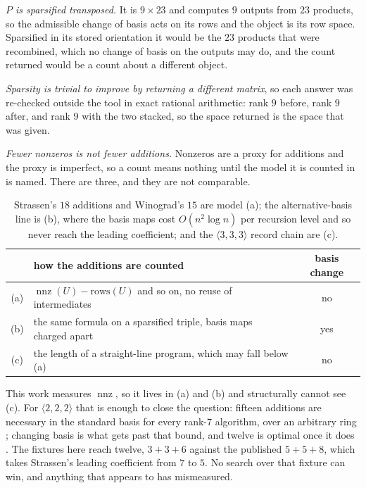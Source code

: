 \documentclass[11pt,reqno]{amsart}
\theoremstyle{plain}
\theoremstyle{definition}
\theoremstyle{remark}
\newcommand{\nnz}{\operatorname{nnz}}
\begin{document}
\emph{$P$ is sparsified transposed.} It is $9\times 23$ and computes $9$ outputs
from $23$ products, so the admissible change of basis acts on its rows and the
object is its row space. Sparsified in its stored orientation it would be the
$23$ products that were recombined, which no change of basis on the outputs may
do, and the count returned would be a count about a different object.

\emph{Sparsity is trivial to improve by returning a different matrix}, so each
answer was re-checked outside the tool in exact rational arithmetic: rank $9$
before, rank $9$ after, and rank $9$ with the two stacked, so the space returned
is the space that was given.

\emph{Fewer nonzeros is not fewer additions.} Nonzeros are a proxy for additions
and the proxy is imperfect, so a count means nothing until the model it is
counted in is named. There are three, and they are not comparable.

\begin{table}[ht]
\centering
\begin{tabular}{clc}
\toprule
 & how the additions are counted & basis change \\
\midrule
(a) & $\nnz(U)-\mathrm{rows}(U)$ and so on, no reuse of intermediates & no \\
(b) & the same formula on a sparsified triple, basis maps charged apart & yes \\
(c) & the length of a straight-line program, which may fall below (a) & no \\
\bottomrule
\end{tabular}
\vspace{0.5em}
\caption{Strassen's $18$ additions and Winograd's $15$ are model (a); the
alternative-basis line \cite{karstadt2017,beniamini2020,holtz2025} is (b), where
the basis maps cost $O(n^{2}\log n)$ per recursion level and so never reach the
leading coefficient; \cite{plinopt} and the $\langle 3,3,3\rangle$ record chain
are (c).}\label{tab:models}
\end{table}

This work measures $\nnz$, so it lives in (a) and (b) and structurally cannot see
(c). For $\langle 2,2,2\rangle$ that is enough to close the question: fifteen
additions are necessary in the standard basis for every rank-$7$ algorithm, over
an arbitrary ring \cite{probert1976,bshouty1995}; changing basis is what gets
past that bound, and twelve is optimal once it does
\cite[Thm.~1.2]{karstadt2017}. The fixtures here reach twelve, $3+3+6$ against
the published $5+5+8$, which takes Strassen's leading coefficient from $7$ to
$5$. No search over that fixture can win, and anything that appears to has
mismeasured.
\end{document}
